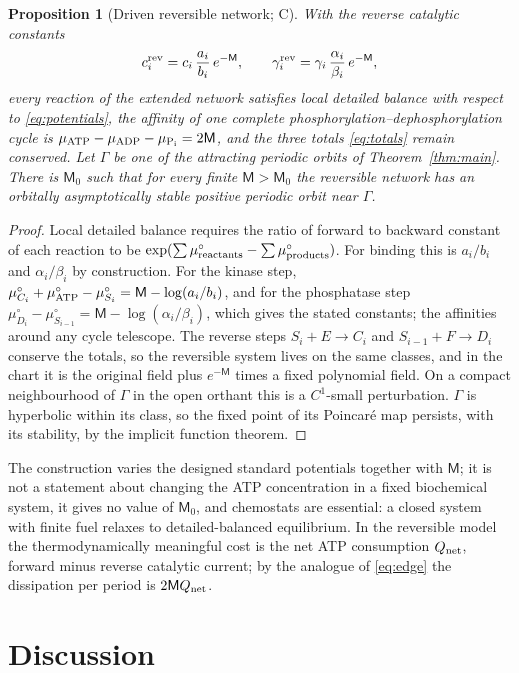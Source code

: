 \documentclass[11pt,a4paper]{article}
\theoremstyle{plain}
\newtheorem{proposition}[theorem]{Proposition}
\theoremstyle{definition}
\theoremstyle{remark}
\newcommand{\evC}{\textsf{C}}
\begin{document}
\begin{proposition}[Driven reversible network; \evC]\label{prop:thermo}
With the reverse catalytic constants
\[
 c_i^{\rm rev}=c_i\,\frac{a_i}{b_i}\,e^{-\mathsf M},\qquad \gamma_i^{\rm rev}=\gamma_i\,\frac{\alpha_i}{\beta_i}\,e^{-\mathsf M},
\]
every reaction of the extended network satisfies local detailed balance with respect to \eqref{eq:potentials}, the affinity of one complete phosphorylation--dephosphorylation cycle is $\mu_{\rm ATP}-\mu_{\rm ADP}-\mu_{\rm P_i}=2\mathsf M$, and the three totals \eqref{eq:totals} remain conserved. Let $\Gamma$ be one of the attracting periodic orbits of Theorem~\ref{thm:main}. There is $\mathsf M_0$ such that for every finite $\mathsf M>\mathsf M_0$ the reversible network has an orbitally asymptotically stable positive periodic orbit near $\Gamma$.
\end{proposition}
\begin{proof}
Local detailed balance requires the ratio of forward to backward constant of each reaction to be $\exp(\sum\mu^\circ_{\rm reactants}-\sum\mu^\circ_{\rm products})$. For binding this is $a_i/b_i$ and $\alpha_i/\beta_i$ by construction. For the kinase step, $\mu^\circ_{C_i}+\mu^\circ_{\rm ATP}-\mu^\circ_{S_i}=\mathsf M-\log(a_i/b_i)$, and for the phosphatase step $\mu^\circ_{D_i}-\mu^\circ_{S_{i-1}}=\mathsf M-\log(\alpha_i/\beta_i)$, which gives the stated constants; the affinities around any cycle telescope. The reverse steps $S_i+E\to C_i$ and $S_{i-1}+F\to D_i$ conserve the totals, so the reversible system lives on the same classes, and in the chart it is the original field plus $e^{-\mathsf M}$ times a fixed polynomial field. On a compact neighbourhood of $\Gamma$ in the open orthant this is a $C^1$-small perturbation. $\Gamma$ is hyperbolic within its class, so the fixed point of its Poincar\'e map persists, with its stability, by the implicit function theorem.
\end{proof}
The construction varies the designed standard potentials together with $\mathsf M$; it is not a statement about changing the ATP concentration in a fixed biochemical system, it gives no value of $\mathsf M_0$, and chemostats are essential: a closed system with finite fuel relaxes to detailed-balanced equilibrium. In the reversible model the thermodynamically meaningful cost is the net ATP consumption $Q_{\rm net}$, forward minus reverse catalytic current; by the analogue of \eqref{eq:edge} the dissipation per period is $2\mathsf MQ_{\rm net}$.

\section{Discussion}\label{sec:discussion}
\end{document}
